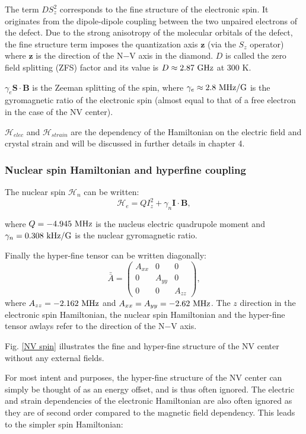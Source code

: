 \documentclass[a4paper,11pt]{report}
\begin{document}
\begin{refsection}
The term $D S_z^2$ corresponds to the fine structure of the electronic spin. It originates from the dipole-dipole coupling between the two unpaired electrons of the defect. Due to the strong anisotropy of the molecular orbitals of the defect, the fine structure term imposes the quantization axis $\mathbf{z}$ (via the $S_z$ operator) where $\mathbf{z}$ is the direction of the N$-$V axis in the diamond. $D$ is called the zero field splitting (ZFS) factor and its value is $D\approx 2.87\ \rm GHz$ at 300 K.

$\gamma_e \mathbf{S} \cdot \mathbf{B}$ is the Zeeman splitting of the spin, where $\gamma_e \approx 2.8\ \rm MHz/G$ is the gyromagnetic ratio of the electronic spin (almost equal to that of a free electron in the case of the NV center).

$\mathcal{H}_{elec}$ and $\mathcal{H}_{strain}$ are the dependency of the Hamiltonian on the electric field and crystal strain and will be discussed in further details in chapter 4.

\subsubsection{Nuclear spin Hamiltonian and hyperfine coupling}
The nuclear spin $\mathcal{H}_n$ can be written:
\begin{equation}
\mathcal{H}_e=Q I_z^2 + \gamma_n \mathbf{I} \cdot \mathbf{B},
\end{equation}

where $Q=-4.945\ \rm MHz$ is the nucleus electric quadrupole moment and $\gamma_n=0.308\ \rm kHz/G$ is the nuclear gyromagnetic ratio.

Finally the hyper-fine tensor can be written diagonally:
\begin{equation}
\bar{\bar{A}} = \begin{pmatrix}
A_{xx} & 0 & 0 \\
0 & A_{yy} & 0 \\
0 & 0 & A_{zz}
\end{pmatrix},
\end{equation}
where $A_{zz}=-2.162\ \rm MHz$ and $A_{xx}=A_{yy}=-2.62\ \rm MHz$. The $z$ direction in the electronic spin Hamiltonian, the nuclear spin Hamiltonian and the hyper-fine tensor awlays refer to the direction of the N$-$V axis.

Fig. \ref{NV spin} illustrates the fine and hyper-fine structure of the NV center without any external fields.

For most intent and purposes, the hyper-fine structure of the NV center can simply be thought of as an energy offset, and is thus often ignored. The electric and strain dependencies of the electronic Hamiltonian are also often ignored as they are of second order compared to the magnetic field dependency. This leads to the simpler spin Hamiltonian:


\end{refsection}
\end{document}
